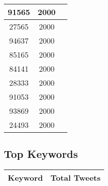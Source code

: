 \documentclass{article}\usepackage[T1]{fontenc}
\begin{document}
\begin{tabular}{|c|c|c|}
 \hline
91565 & 2000\\ 
 \hline
27565 & 2000\\ 
 \hline
94637 & 2000\\ 
 \hline
85165 & 2000\\ 
 \hline
84141 & 2000\\ 
 \hline
28333 & 2000\\ 
 \hline
91053 & 2000\\ 
 \hline
93869 & 2000\\ 
 \hline
24493 & 2000\\ 
 \hline
\end{tabular}\subsection*{Top Keywords}\begin{tabular}{|c|c|}         \hline         Keyword & Total Tweets \\ 
 \hline
\end{tabular}
\end{document}
